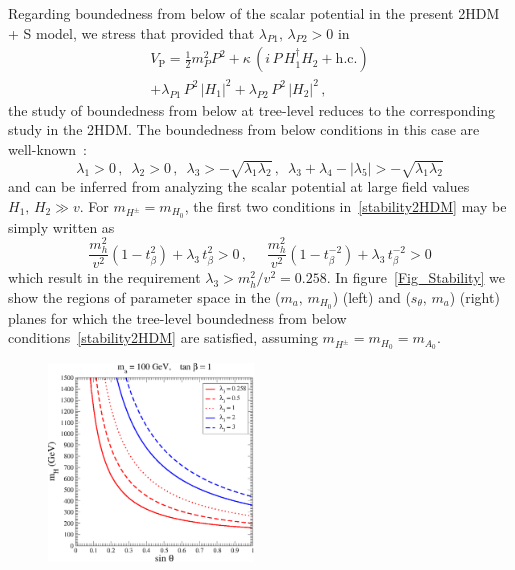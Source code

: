 \begin{itemize}
    Regarding boundedness from below of the scalar potential in the present 2HDM + S model, we stress that provided that 
    $\lambda_{P1}, \, \lambda_{P2} > 0$ in
    \begin{eqnarray}
     V_{\mathrm{P}} = \frac{1}{2} m_{P}^2 P^2 + \kappa\, (i \,P\, H_1^{\dagger}H_2 + \mathrm{h.c.}) \nonumber \\
            + \lambda_{P1} \,P^2\, \left|H_1\right|^2 + \lambda_{P2} \,P^2 \,\left|H_2\right|^2 \, ,\nonumber
    \end{eqnarray}
    the study of boundedness from below at tree-level reduces to the corresponding study in the 2HDM. The boundedness from below conditions 
    in this case are well-known~\cite{Gunion:2002zf}:
    \begin{equation}
    \label{stability2HDM}
     \lambda_1 > 0\,, \,\,\, \lambda_2 > 0\,, \,\,\, \lambda_3 > - \sqrt{\lambda_1 \lambda_2} \,, \,\,\, \lambda_3 + \lambda_4 - |\lambda_5| > - \sqrt{\lambda_1 \lambda_2} 
    \end{equation}
    and can be inferred from analyzing the scalar potential at large field values $H_1,\,H_2 \gg v$. For $m_{H^{\pm}} = m_{H_0}$, the first two conditions 
    in~\eqref{stability2HDM} may be simply written as
    \begin{equation}
     \frac{m_h^2}{v^2} (1-t_{\beta}^{2}) + \lambda_3 \, t_{\beta}^{2} > 0\,, \quad\,\, \frac{m_h^2}{v^2} (1-t_{\beta}^{-2}) + \lambda_3 \, t_{\beta}^{-2} > 0
     \end{equation}
    which result in the requirement $\lambda_3 > m_h^2/v^2 = 0.258$. In figure~\ref{Fig_Stability} we show the regions of parameter space in the 
    ($m_a,\, m_{H_0}$) (left) and ($s_{\theta},\, m_a$) (right) planes for which the tree-level boundedness from below conditions~\ref{stability2HDM}
    are satisfied, assuming $m_{H^{\pm}} = m_{H_0} = m_{A_0}$.
    \begin{figure}[h!]
\begin{center}
\includegraphics[width=0.485\textwidth]{texinputs/03_theoparameters/Figs/Plot_Eq.pdf}

\end{center}
\end{figure}
\end{itemize}
